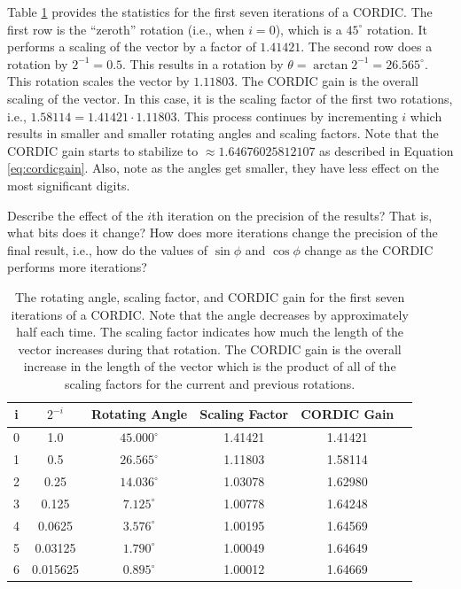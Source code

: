 Table \ref{table:cordic} provides the statistics for the first seven iterations of a CORDIC. The first row is the ``zeroth'' rotation (i.e., when $i=0$), which is a $45^{\circ}$ rotation. It performs a scaling of the vector by a factor of $1.41421$. The second row does a rotation by $2^{-1} = 0.5$. This results in a rotation by $\theta = \arctan 2^{-1} = 26.565^{\circ}$. This rotation scales the vector by $1.11803$. The CORDIC gain is the overall scaling of the vector. In this case, it is the scaling factor of the first two rotations, i.e., $1.58114 = 1.41421 \cdot 1.11803$. This process continues by incrementing $i$ which results in smaller and smaller rotating angles and scaling factors. Note that the CORDIC gain starts to stabilize to $\approx 1.64676025812107$ as described in Equation \ref{eq:cordicgain}. Also, note as the angles get smaller, they have less effect on the most significant digits. 

\begin{exercise}
Describe the effect of the $i$th iteration on the precision of the results? That is, what bits does it change? How does more iterations change the precision of the final result, i.e., how do the values of $\sin \phi$ and $\cos \phi$ change as the CORDIC performs more iterations?
\end{exercise}



\begin{table}[htbp]
\caption{The rotating angle, scaling factor, and CORDIC gain for the first seven iterations of a CORDIC. Note that the angle decreases by approximately half each time. The scaling factor indicates how much the length of the vector increases during that rotation. The CORDIC gain is the overall increase in the length of the vector which is the product of all of the scaling factors for the current and previous rotations.}
\begin{center}
\begin{tabular}{|c|c|c|c|c|c|}
\hline
i & $2^{-i}$ 	& Rotating Angle  	& Scaling Factor 	& CORDIC Gain 	\\ \hline \hline
0 & 1.0 		& $45.000^{\circ}$	& 1.41421			& 1.41421		\\ \hline
1 & 0.5 		& $26.565^{\circ}$	& 1.11803			& 1.58114		\\ \hline
2 & 0.25 		& $14.036^{\circ}$	& 1.03078			& 1.62980		\\ \hline
3 & 0.125 		& $7.125^{\circ}$	& 1.00778			& 1.64248		\\ \hline
4 & 0.0625 	& $3.576^{\circ}$	& 1.00195			& 1.64569		\\ \hline
5 & 0.03125 	& $1.790^{\circ}$	& 1.00049			& 1.64649		\\ \hline
6 & 0.015625 	& $0.895^{\circ}$	& 1.00012			& 1.64669		\\ \hline
\end{tabular}
\end{center}
\label{table:cordic}
\end{table}%


